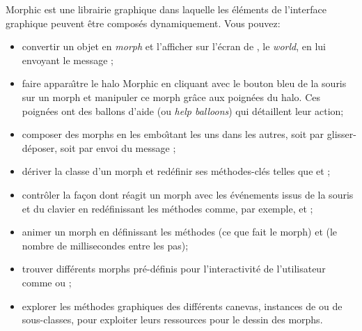 \documentclass[a4paper,10pt,twoside]{book}
\begin{document}
Morphic est une librairie graphique dans laquelle les \'el\'ements de
l'interface graphique peuvent \^etre compos\'es dynamiquement.
Vous pouvez:
\begin{itemize}
  \item convertir un objet en \emph{morph} et l'afficher
    sur l'\'ecran de \sq, le \emph{world}, en lui envoyant le message
    ;
  \item faire appara\^{\i}tre le halo Morphic en cliquant avec le
    bouton bleu de la souris sur un morph et manipuler ce morph
    gr\^ace aux poign\'ees du halo. Ces poign\'ees ont des ballons
    d'aide (ou \emph{help balloons}) qui d\'etaillent leur action;
  \item composer des morphs en les embo\^{\i}tant les uns dans les autres,
    soit par glisser-d\'eposer, soit par envoi du message ;
  \item d\'eriver la classe d'un morph et red\'efinir ses
    m\'ethodes-cl\'es telles que  et ;
  \item contr\^oler la fa\c{c}on dont r\'eagit un morph avec les
    \'ev\'enements issus de la souris et du clavier en red\'efinissant les
    m\'ethodes comme, par exemple,  et
    ;
  \item animer un morph en d\'efinissant les m\'ethodes 
    (ce que fait le morph) et  (le nombre de
    millisecondes entre les pas);
  \item trouver diff\'erents morphs pr\'e-d\'efinis pour
    l'interactivit\'e de l'utilisateur comme
     ou ;
  \item explorer les m\'ethodes graphiques des diff\'erents canevas,
    instances de  ou de sous-classes,
    pour exploiter leurs ressources pour le dessin des morphs.
\end{itemize}

\ifx\wholebook\relax\else
\end{document}
